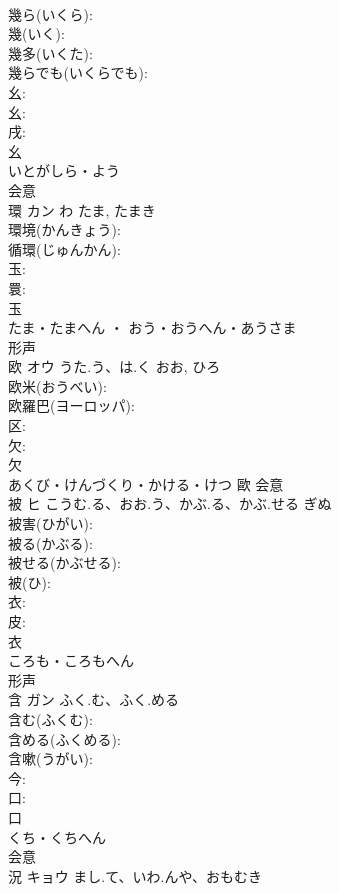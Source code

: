 \documentclass[8pt]{extreport}
\begin{document}
\begin{CJK}{UTF8}{min}
\\	幾ら(いくら): 
\\	幾(いく): 
\\	幾多(いくた): 
\\	幾らでも(いくらでも): 
\\	幺: 
\\	幺: 
\\	戌: 
\\	幺	
\\	いとがしら・よう	
\\	会意 
\\	環	カン	わ	たま, たまき	
\\	環境(かんきょう): 
\\	循環(じゅんかん): 
\\	玉: 
\\	睘: 
\\	玉	
\\	たま・たまへん ・ おう・おうへん・あうさま	
\\	形声 
\\	欧	オウ	うた.う、は.く	おお, ひろ	
\\	欧米(おうべい): 
\\	欧羅巴(ヨーロッパ): 
\\	区: 
\\	欠: 
\\	欠	
\\	あくび・けんづくり・かける・けつ	歐	会意 
\\	被	ヒ	こうむ.る、おお.う、かぶ.る、かぶ.せる	ぎぬ	
\\	被害(ひがい): 
\\	被る(かぶる): 
\\	被せる(かぶせる): 
\\	被(ひ): 
\\	衣: 
\\	皮: 
\\	衣	
\\	ころも・ころもへん	
\\	形声 
\\	含	ガン	ふく.む、ふく.める		
\\	含む(ふくむ): 
\\	含める(ふくめる): 
\\	含嗽(うがい): 
\\	今: 
\\	口: 
\\	口	
\\	くち・くちへん	
\\	会意 
\\	況	キョウ	まし.て、いわ.んや、おもむき		

\end{CJK}
\end{document}
